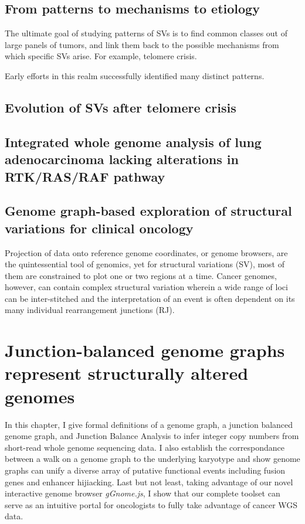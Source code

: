 \documentclass[phd,tocprelim]{cornell}
\begin{document}
\section{From patterns to mechanisms to etiology}
The ultimate goal of studying patterns of SVs is to find common classes out of large panels of tumors, and link them back to the possible mechanisms from which specific SVs arise. For example, telomere crisis.

Early efforts in this realm successfully identified many distinct patterns.

\section{Evolution of SVs after telomere crisis}

\section{Integrated whole genome analysis of lung adenocarcinoma lacking alterations in RTK/RAS/RAF pathway}


\section{Genome graph-based exploration of structural variations for clinical oncology}

Projection of data onto reference genome coordinates, or genome browsers, are the quintessential tool of genomics, yet for structural variations (SV), most of them are constrained to plot one or two regions at a time. Cancer genomes, however, can contain complex structural variation wherein a wide range of loci can be inter-stitched and the interpretation of an event is often dependent on its many individual rearrangement junctions (RJ).

\chapter{Junction-balanced genome graphs represent structurally altered genomes}
In this chapter, I give formal definitions of a genome graph, a junction balanced genome graph, and Junction Balance Analysis to infer integer copy numbers from short-read whole genome sequencing data. I also establish the correspondance between a walk on a genome graph to the underlying karyotype and show genome graphs can unify a diverse array of putative functional events including fusion genes and enhancer hijiacking. Last but not least, taking advantage of our novel interactive genome browser \textit{gGnome.js}, I show that our complete toolset can serve as an intuitive portal for oncologists to fully take advantage of cancer WGS data.
\end{document}
